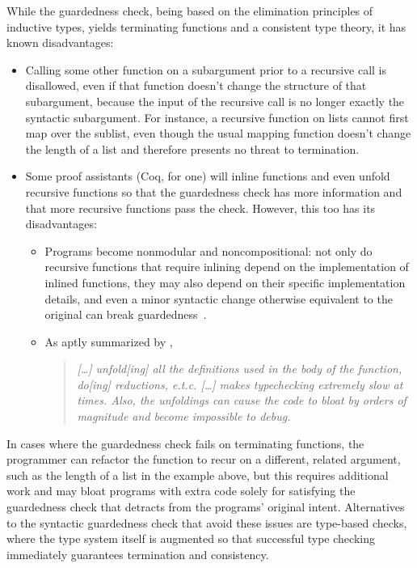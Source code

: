 While the guardedness check, being based on the elimination principles of inductive types,
yields terminating functions and a consistent type theory,
it has known disadvantages:

\begin{itemize}
  \item Calling some other function on a subargument prior to a recursive call is disallowed,
    even if that function doesn't change the structure of that subargument,
    because the input of the recursive call is no longer exactly the syntactic subargument.
    For instance, a recursive function on lists cannot first map over the sublist,
    even though the usual mapping function doesn't change the length of a list
    and therefore presents no threat to termination.
  \item Some proof assistants (Coq, for one) will inline functions and even unfold recursive functions
    so that the guardedness check has more information
    and that more recursive functions pass the check.
    However, this too has its disadvantages:
    \begin{itemize}
      \item Programs become nonmodular and noncompositional:
        not only do recursive functions that require inlining
        depend on the implementation of inlined functions,
        they may also depend on their specific implementation details,
        and even a minor syntactic change otherwise equivalent to the original
        can break guardedness~\citep{CIC-hat-minus}.
      \item As aptly summarized by \citet{coqterm},
        \begin{quote}
        \begin{singlespace}
        \textit{{\rm [\ldots]} unfold{\rm [ing]} all the definitions used in the body of the function, do{\rm [ing]} reductions, e.t.c.
        {\rm [\ldots]} makes typechecking extremely slow at times.
        Also, the unfoldings can cause the code to bloat by orders of magnitude and become impossible to debug.}
        \end{singlespace}
        \end{quote}
    \end{itemize}
\end{itemize}

In cases where the guardedness check fails on terminating functions,
the programmer can refactor the function to recur on a different, related argument,
such as the length of a list in the example above,
but this requires additional work and may bloat programs
with extra code solely for satisfying the guardedness check
that detracts from the programs' original intent.
Alternatives to the syntactic guardedness check that avoid these issues are type-based checks,
where the type system itself is augmented so that successful type checking
immediately guarantees termination and consistency.


